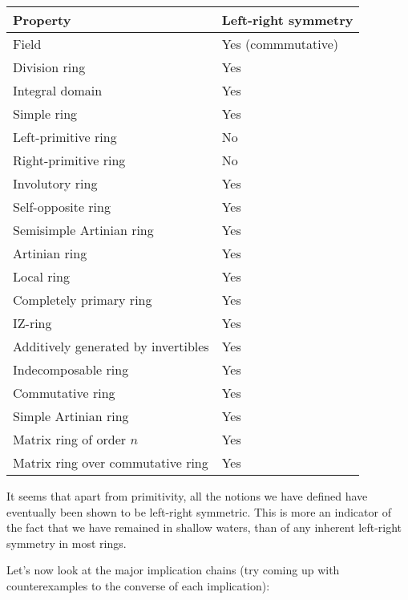 \documentclass[a4paper]{amsart}
\begin{document}
\begin{tabular}{|l|l|}
  \hline
  Property & Left-right symmetry\\
  \hline
  Field & Yes (commmutative)\\
  Division ring & Yes\\
  Integral domain & Yes\\
  Simple ring & Yes\\
  Left-primitive ring & No\\
  Right-primitive ring & No\\
  Involutory ring & Yes\\
  Self-opposite ring & Yes\\
  Semisimple Artinian ring & Yes\\
  Artinian ring & Yes\\
  Local ring & Yes\\
  Completely primary ring & Yes\\
  IZ-ring & Yes\\
  Additively generated by invertibles & Yes\\
  Indecomposable ring & Yes\\
  Commutative ring & Yes\\
  Simple Artinian ring & Yes\\
  Matrix ring of order $n$ & Yes\\
  Matrix ring over commutative ring & Yes\\
  \hline
\end{tabular}

It seems that apart from primitivity, all the notions we have defined
have eventually been shown to be left-right symmetric. This is more an
indicator of the fact that we have remained in shallow waters, than of
any inherent left-right symmetry in most rings.

Let's now look at the major implication chains (try coming up with
counterexamples to the converse of each implication):
\end{document}
